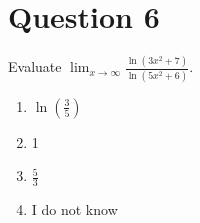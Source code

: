 
\section*{Question 6}
Evaluate $\displaystyle\lim_{x\to\infty}\frac{\ln(3x^2+7)}{\ln(5x^2+6)}$.
    
\begin{enumerate}[label = \alph*.]
    \item $\displaystyle\ln\left(\frac{3}{5}\right)$
    \item 1
    \item $\displaystyle\frac{5}{3}$
    \item I do not know
\end{enumerate}

\setcounter{solutionMainStep}{0}
\setcounter{solutionSubStep}{0}

